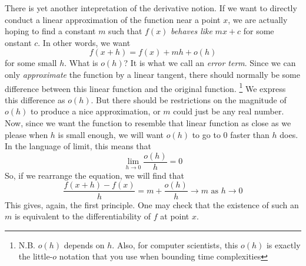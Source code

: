 There is yet another intepretation of the derivative notion.
If we want to directly conduct a linear approximation of the function near a point $x$, we are actually hoping to find a constant $m$ such that $f(x)$ \textit{behaves like} $mx+c$ for some onstant $c$.
In other words, we want
$$f(x+h)=f(x)+mh+o(h)$$
for some small $h$.
What is $o(h)$? It is what we call an \textit{error term}.
Since we can only \textit{approximate} the function by a linear tangent, there should normally be some difference between this linear function and the original function.
\footnote{N.B. $o(h)$ depends on $h$. Also, for computer scientists, this $o(h)$ is exactly the little-$o$ notation that you use when bounding time complexities}
We express this difference as $o(h)$.
But there should be restrictions on the magnitude of $o(h)$ to produce a nice approximation, or $m$ could just be any real number.
Now, since we want the function to resemble that linear function as close as we please when $h$ is small enough, we will want $o(h)$ to go to $0$ faster than $h$ does.
In the language of limit, this means that
$$\lim_{h\to0}\frac{o(h)}{h}=0$$
So, if we rearrange the equation, we will find that
$$\frac{f(x+h)-f(x)}{h}=m+\frac{o(h)}{h}\to m\text{ as }h\to0$$
This gives, again, the first principle. One may check that the existence of such an $m$ is equivalent to the differentiability of $f$ at point $x$.